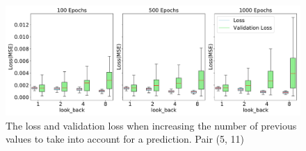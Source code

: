 	\begin{figure}[H]
		\centering
		\includegraphics[width=1\linewidth]{Pictures/Results/experiment_2_1_5}
		\caption{The loss and validation loss when increasing the number of previous values to take into account for a prediction. Pair (5, 11)}
		\label{fig:experiment_2_1_5}
	\end{figure}


